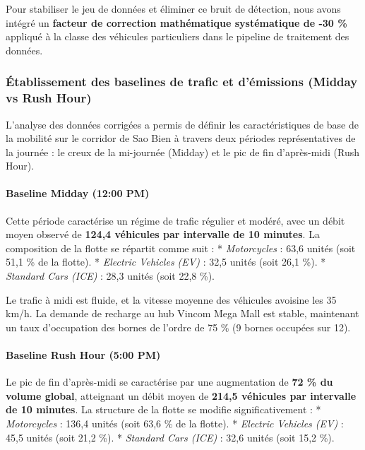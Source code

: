 \documentclass[11pt, a4paper]{article}
\begin{document}
Pour stabiliser le jeu de données et éliminer ce bruit de détection,
nous avons intégré un \textbf{facteur de correction mathématique
systématique de -30 \%} appliqué à la classe des véhicules particuliers
dans le pipeline de traitement des données.

\subsubsection{Établissement des baselines de trafic et d'émissions
(Midday vs Rush
Hour)}\label{uxe9tablissement-des-baselines-de-trafic-et-duxe9missions-midday-vs-rush-hour}

L'analyse des données corrigées a permis de définir les caractéristiques
de base de la mobilité sur le corridor de Sao Bien à travers deux
périodes représentatives de la journée : le creux de la mi-journée
(Midday) et le pic de fin d'après-midi (Rush Hour).

\paragraph{Baseline Midday (12:00 PM)}\label{baseline-midday-1200-pm}

Cette période caractérise un régime de trafic régulier et modéré, avec
un débit moyen observé de \textbf{124,4 véhicules par intervalle de 10
minutes}. La composition de la flotte se répartit comme suit : *
\emph{Motorcycles} : 63,6 unités (soit 51,1 \% de la flotte). *
\emph{Electric Vehicles (EV)} : 32,5 unités (soit 26,1 \%). *
\emph{Standard Cars (ICE)} : 28,3 unités (soit 22,8 \%).

Le trafic à midi est fluide, et la vitesse moyenne des véhicules
avoisine les 35 km/h. La demande de recharge au hub Vincom Mega Mall est
stable, maintenant un taux d'occupation des bornes de l'ordre de 75 \%
(9 bornes occupées sur 12).

\paragraph{Baseline Rush Hour (5:00
PM)}\label{baseline-rush-hour-500-pm}

Le pic de fin d'après-midi se caractérise par une augmentation de
\textbf{72 \% du volume global}, atteignant un débit moyen de
\textbf{214,5 véhicules par intervalle de 10 minutes}. La structure de
la flotte se modifie significativement : * \emph{Motorcycles} : 136,4
unités (soit 63,6 \% de la flotte). * \emph{Electric Vehicles (EV)} :
45,5 unités (soit 21,2 \%). * \emph{Standard Cars (ICE)} : 32,6 unités
(soit 15,2 \%).
\end{document}
